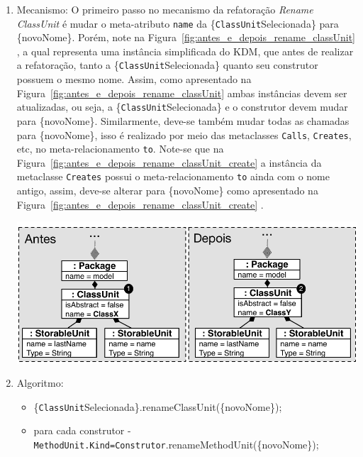 \begin{enumerate}
\begin{enumerate}
			\item Mecanismo: O primeiro passo no mecanismo da refatoração \textit{Rename ClassUnit} é mudar o meta-atributo \texttt{name} da \{\texttt{ClassUnit}Selecionada\} para \{novoNome\}. Porém, note na Figura~\ref{fig:antes_e_depois_rename_classUnit} , a qual representa uma instância simplificada do KDM, que antes de realizar a refatoração, tanto a \{\texttt{ClassUnit}Selecionada\} quanto seu construtor possuem o mesmo nome. Assim, como apresentado na Figura~\ref{fig:antes_e_depois_rename_classUnit}  ambas instâncias devem ser atualizadas, ou seja, a \{\texttt{ClassUnit}Selecionada\} e o construtor devem mudar para \{novoNome\}. Similarmente, deve-se também mudar todas as chamadas para \{novoNome\}, isso é realizado por meio das metaclasses \texttt{Calls}, \texttt{Creates}, etc, no meta-relacionamento \texttt{to}. Note-se que na Figura~\ref{fig:antes_e_depois_rename_classUnit_create}   a instância da metaclasse \texttt{Creates} possui o meta-relacionamento \texttt{to} ainda com o nome antigo, assim, deve-se alterar para \{novoNome\} como apresentado na Figura~\ref{fig:antes_e_depois_rename_classUnit_create} .
			\begin{minipage}{.90\textwidth}
	\vspace*{\fill}
  \centering
	\includegraphics[scale=0.6]{images/antes_depois_refatoracao_renameClassUnit}
	\fautor
	\label{fig:antes_e_depois_rename_classUnit}
\end{minipage}\hfill
			\item Algoritmo: 
			    \begin{itemize}
			        \item \{\texttt{ClassUnit}Selecionada\}.renameClassUnit(\{novoNome\});
			        \item para cada construtor - \texttt{MethodUnit.Kind=Construtor}.renameMethodUnit(\{novoNome\});

\end{itemize}
\end{enumerate}
\end{enumerate}
